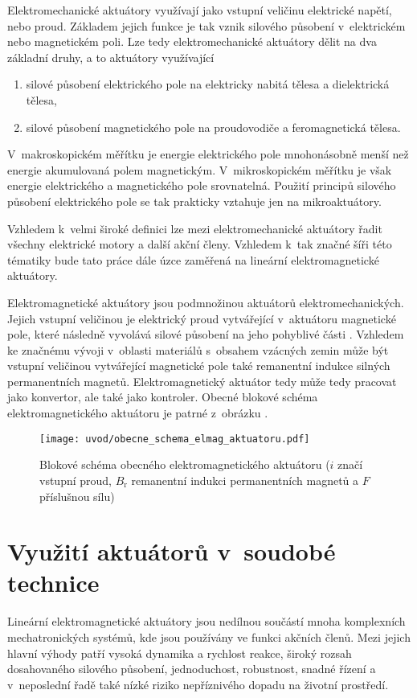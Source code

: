 Elektromechanické aktuátory využívají jako vstupní veličinu elektrické napětí, nebo proud. Základem jejich funkce je tak vznik silového působení v~elektrickém nebo magnetickém poli. Lze tedy elektromechanické aktuátory dělit na dva základní druhy, a to aktuátory využívající
\begin{enumerate}[a]
    \item silové působení elektrického pole na elektricky nabitá tělesa a dielektrická tělesa,
    \item silové působení magnetického pole na proudovodiče a feromagnetická tělesa.
\end{enumerate}

V~makroskopickém měřítku je energie elektrického pole mnohonásobně menší než energie akumulovaná polem magnetickým. V~mikroskopickém měřítku je však energie elektrického a magnetického pole srovnatelná. Použití principů silového působení elektrického pole se tak prakticky vztahuje jen na mikroaktuátory. \cite{husak2008mikrosenzory}

Vzhledem k~velmi široké definici lze mezi elektromechanické aktuátory řadit všechny elektrické motory a další akční členy. Vzhledem k~tak značné šíři této tématiky bude tato práce dále úzce zaměřená na lineární elektromagnetické aktuátory.

Elektromagnetické aktuátory jsou podmnožinou aktuátorů elektromechanických. Jejich vstupní veličinou je elektrický proud vytvářející v~aktuátoru magnetické pole, které následně vyvolává silové působení na jeho pohyblivé části \cite{boldea2005linear}. Vzhledem ke značnému vývoji v~oblasti materiálů s~obsahem vzácných zemin může být vstupní veličinou vytvářející magnetické pole také remanentní indukce silných permanentních magnetů. Elektromagnetický aktuátor tedy může tedy pracovat jako konvertor, ale také jako kontroler. Obecné blokové schéma elektromagnetického aktuátoru je patrné z~obrázku . \cite{mach2010aktuatory}

\begin{figure}[h!]
  \centering
  \texttt{[image: uvod/obecne\_schema\_elmag\_aktuatoru.pdf]}
  \caption{Blokové schéma obecného elektromagnetického aktuátoru ($i$ značí vstupní proud, $B_\mathrm{r}$ remanentní indukci permanentních magnetů a $F$ příslušnou sílu)}
  \label{obr:obecne_schema_elmag_aktuatoru}
\end{figure}

\section{Využití aktuátorů v~soudobé technice}
Lineární elektromagnetické aktuátory jsou nedílnou součástí mnoha komplexních mechatronických systémů, kde jsou používány ve funkci akčních členů. Mezi jejich hlavní výhody patří vysoká dynamika a rychlost reakce, široký rozsah dosahovaného silového působení, jednoduchost, robustnost, snadné řízení a v~neposlední řadě také nízké riziko nepříznivého dopadu na životní prostředí. \cite{gomis2010design}

